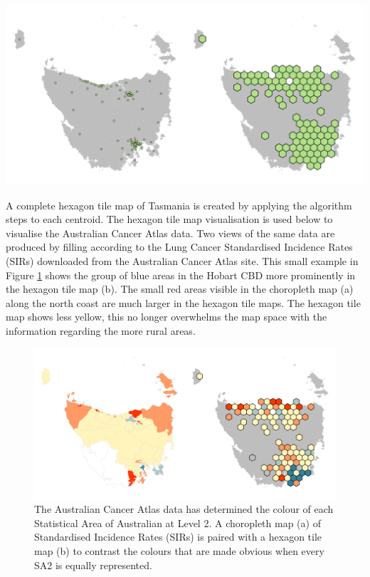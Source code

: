 \documentclass[
]{jss}
\begin{document}
\begin{CodeChunk}


\begin{center}\includegraphics[width=1\linewidth]{figures/6allocate} \end{center}

\end{CodeChunk}

A complete hexagon tile map of Tasmania is created by applying the
algorithm steps to each centroid. The hexagon tile map visualisation is
used below to visualise the Australian Cancer Atlas data. Two views of
the same data are produced by filling according to the Lung Cancer
Standardised Incidence Rates (SIRs) downloaded from the Australian
Cancer Atlas site. This small example in Figure \ref{fig:sir} shows the
group of blue areas in the Hobart CBD more prominently in the hexagon
tile map (b). The small red areas visible in the choropleth map (a)
along the north coast are much larger in the hexagon tile maps. The
hexagon tile map shows less yellow, this no longer overwhelms the map
space with the information regarding the more rural areas.

\begin{CodeChunk}
\begin{figure}

{\centering \includegraphics[width=1\linewidth]{figures/7SIR} 

}

\caption[The Australian Cancer Atlas data has determined the colour of each Statistical Area of Australian at Level 2]{The Australian Cancer Atlas data has determined the colour of each Statistical Area of Australian at Level 2. A choropleth map (a) of Standardised Incidence Rates (SIRs) is paired with a hexagon tile map (b) to contrast the colours that are made obvious when every SA2 is equally represented.}\label{fig:sir}
\end{figure}
\end{CodeChunk}
\end{document}
